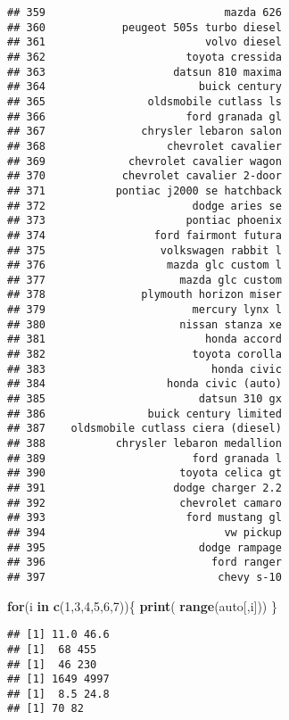 \documentclass[
]{article}
\newenvironment{Shaded}{\begin{snugshade}}{\end{snugshade}}
\newcommand{\ControlFlowTok}[1]{\textcolor[rgb]{0.13,0.29,0.53}{\textbf{#1}}}
\newcommand{\DecValTok}[1]{\textcolor[rgb]{0.00,0.00,0.81}{#1}}
\newcommand{\FunctionTok}[1]{\textcolor[rgb]{0.13,0.29,0.53}{\textbf{#1}}}
\newcommand{\NormalTok}[1]{#1}
\begin{document}
\begin{verbatim}
## 359                            mazda 626
## 360            peugeot 505s turbo diesel
## 361                         volvo diesel
## 362                      toyota cressida
## 363                    datsun 810 maxima
## 364                        buick century
## 365                oldsmobile cutlass ls
## 366                      ford granada gl
## 367               chrysler lebaron salon
## 368                   chevrolet cavalier
## 369             chevrolet cavalier wagon
## 370            chevrolet cavalier 2-door
## 371           pontiac j2000 se hatchback
## 372                       dodge aries se
## 373                      pontiac phoenix
## 374                 ford fairmont futura
## 375                  volkswagen rabbit l
## 376                   mazda glc custom l
## 377                     mazda glc custom
## 378               plymouth horizon miser
## 379                       mercury lynx l
## 380                     nissan stanza xe
## 381                         honda accord
## 382                       toyota corolla
## 383                          honda civic
## 384                   honda civic (auto)
## 385                        datsun 310 gx
## 386                buick century limited
## 387    oldsmobile cutlass ciera (diesel)
## 388           chrysler lebaron medallion
## 389                       ford granada l
## 390                     toyota celica gt
## 391                    dodge charger 2.2
## 392                     chevrolet camaro
## 393                      ford mustang gl
## 394                            vw pickup
## 395                        dodge rampage
## 396                          ford ranger
## 397                           chevy s-10
\end{verbatim}

\begin{Shaded}
\begin{Highlighting}[]
\ControlFlowTok{for}\NormalTok{(i }\ControlFlowTok{in} \FunctionTok{c}\NormalTok{(}\DecValTok{1}\NormalTok{,}\DecValTok{3}\NormalTok{,}\DecValTok{4}\NormalTok{,}\DecValTok{5}\NormalTok{,}\DecValTok{6}\NormalTok{,}\DecValTok{7}\NormalTok{))\{}
 \FunctionTok{print}\NormalTok{( }\FunctionTok{range}\NormalTok{(auto[,i]))}
\NormalTok{\}}
\end{Highlighting}
\end{Shaded}

\begin{verbatim}
## [1] 11.0 46.6
## [1]  68 455
## [1]  46 230
## [1] 1649 4997
## [1]  8.5 24.8
## [1] 70 82
\end{verbatim}
\end{document}

